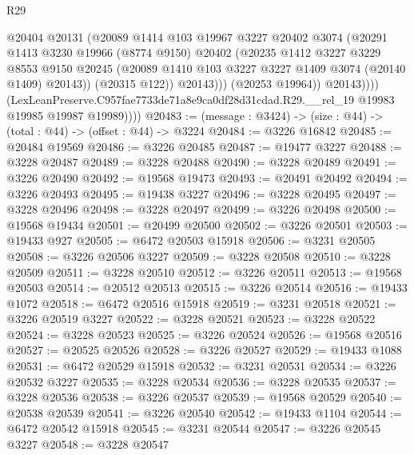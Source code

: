 \begin{lexlean}{R29}
\begin{coremodule}
                        @20404
                        @20131
                        (@20089
                          @1414
                          @103
                          @19967
                          @3227
                          @20402
                          @3074
                          (@20291
                            @1413
                            @3230
                            @19966
                            (@8774 @9150)
                            @20402
                            (@20235
                              @1412
                              @3227
                              @3229
                              @8553
                              @9150
                              @20245
                              (@20089 @1410 @103 @3227 @3227 @1409 @3074 (@20140 @1409) @20143))
                            (@20315 @122))
                          @20143)))
                    (@20253 @19964))
                  @20143))))
          (LexLeanPreserve.C957fae7733de71a8e9ca0df28d31cdad.R29.__rel_19
            @19983
            @19985
            @19987
            @19989))))
@20483 := (message : @3424) -> (size : @44) -> (total : @44) -> (offset : @44) -> @3224
@20484 := @3226 @16842
@20485 := @20484 @19569
@20486 := @3226 @20485
@20487 := @19477 @3227
@20488 := @3228 @20487
@20489 := @3228 @20488
@20490 := @3228 @20489
@20491 := @3226 @20490
@20492 := @19568 @19473
@20493 := @20491 @20492
@20494 := @3226 @20493
@20495 := @19438 @3227
@20496 := @3228 @20495
@20497 := @3228 @20496
@20498 := @3228 @20497
@20499 := @3226 @20498
@20500 := @19568 @19434
@20501 := @20499 @20500
@20502 := @3226 @20501
@20503 := @19433 @927
@20505 := @6472 @20503 @15918
@20506 := @3231 @20505
@20508 := @3226 @20506 @3227
@20509 := @3228 @20508
@20510 := @3228 @20509
@20511 := @3228 @20510
@20512 := @3226 @20511
@20513 := @19568 @20503
@20514 := @20512 @20513
@20515 := @3226 @20514
@20516 := @19433 @1072
@20518 := @6472 @20516 @15918
@20519 := @3231 @20518
@20521 := @3226 @20519 @3227
@20522 := @3228 @20521
@20523 := @3228 @20522
@20524 := @3228 @20523
@20525 := @3226 @20524
@20526 := @19568 @20516
@20527 := @20525 @20526
@20528 := @3226 @20527
@20529 := @19433 @1088
@20531 := @6472 @20529 @15918
@20532 := @3231 @20531
@20534 := @3226 @20532 @3227
@20535 := @3228 @20534
@20536 := @3228 @20535
@20537 := @3228 @20536
@20538 := @3226 @20537
@20539 := @19568 @20529
@20540 := @20538 @20539
@20541 := @3226 @20540
@20542 := @19433 @1104
@20544 := @6472 @20542 @15918
@20545 := @3231 @20544
@20547 := @3226 @20545 @3227
@20548 := @3228 @20547

\end{coremodule}
\end{lexlean}
